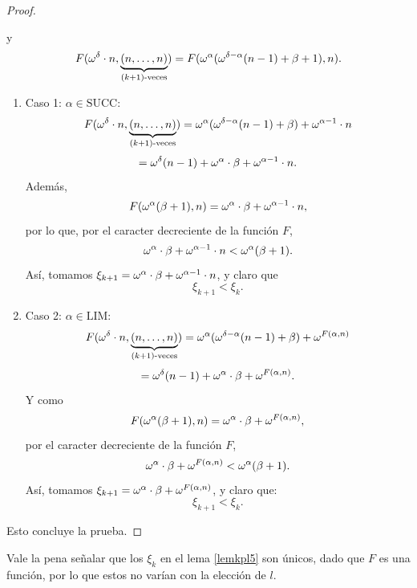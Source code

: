 \begin{proof}
\begin{itemize}
            y
            \[F(\omega^\delta\cdot n,\underbrace{(n,\ldots,n)}_{(k+1)\text{-veces}})=F(\omega^\alpha(\omega^{\delta-\alpha}(n-1)+\beta+1),n).\]
            \begin{enumerate}
                \item Caso 1: $\alpha\in\text{SUCC}$:
                    \[F(\omega^\delta\cdot n,\underbrace{(n,\ldots,n)}_{(k+1)\text{-veces}})=\omega^\alpha(\omega^{\delta-\alpha}(n-1)+\beta)+\omega^{\alpha-1}\cdot n\]
                    \[=\omega^\delta(n-1)+\omega^\alpha\cdot\beta+\omega^{\alpha-1}\cdot n.\]
                    Además, 
                    \[F(\omega^\alpha(\beta+1),n)=\omega^\alpha\cdot\beta+\omega^{\alpha-1}\cdot n,\]
                    por lo que, por el caracter decreciente de la función $F$,
                    \[\omega^\alpha\cdot\beta+\omega^{\alpha-1}\cdot n<\omega^\alpha(\beta+1).\]
                    Así, tomamos $\xi_{k+1}=\omega^\alpha\cdot\beta+\omega^{\alpha-1}\cdot n$, y claro que
                    \[\xi_{k+1}<\xi_k.\]
                \item Caso 2: $\alpha\in\text{LIM}$:
                    \[F(\omega^\delta\cdot n,\underbrace{(n,\ldots,n)}_{(k+1)\text{-veces}})=\omega^\alpha(\omega^{\delta-\alpha}(n-1)+\beta)+\omega^{F(\alpha,n)}\]
                    \[=\omega^\delta(n-1)+\omega^\alpha\cdot\beta+\omega^{F(\alpha,n)}.\]
                    Y como
                    \[F(\omega^\alpha(\beta+1),n)=\omega^\alpha\cdot\beta+\omega^{F(\alpha,n)},\]
                    por el caracter decreciente de la función $F$,
                    \[\omega^\alpha\cdot\beta+\omega^{F(\alpha,n)}<\omega^\alpha(\beta+1).\]
                    Así, tomamos $\xi_{k+1}=\omega^\alpha\cdot\beta+\omega^{F(\alpha,n)}$, y claro que:
                    \[\xi_{k+1}<\xi_k.\]
            \end{enumerate}
    \end{itemize}
    Esto concluye la prueba.
\end{proof}
\begin{obs}
    Vale la pena señalar que los $\xi_k$ en el lema {\ref{lemkpl5}} son únicos, dado que $F$ es una función, por lo que estos no varían con la elección de $l$.
\end{obs}

